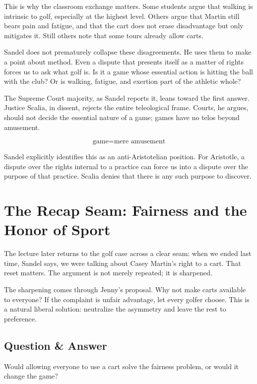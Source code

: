 This is why the classroom exchange matters. Some students argue that walking is intrinsic to golf, especially at the highest level. Others argue that Martin still bears pain and fatigue, and that the cart does not erase disadvantage but only mitigates it. Still others note that some tours already allow carts.

Sandel does not prematurely collapse these disagreements. He uses them to make a point about method. Even a dispute that presents itself as a matter of rights forces us to ask what golf is. Is it a game whose essential action is hitting the ball with the club? Or is walking, fatigue, and exertion part of the athletic whole?

The Supreme Court majority, as Sandel reports it, leans toward the first answer. Justice Scalia, in dissent, rejects the entire teleological frame. Courts, he argues, should not decide the essential nature of a game; games have no telos beyond amusement.

\begin{equation}
\text{game}=\text{mere amusement}
\end{equation}

Sandel explicitly identifies this as an anti-Aristotelian position. For Aristotle, a dispute over the rights internal to a practice can force us into a dispute over the purpose of that practice. Scalia denies that there is any such purpose to discover.

\section{The Recap Seam: Fairness and the Honor of Sport}

The lecture later returns to the golf case across a clear seam: when we ended last time, Sandel says, we were talking about Casey Martin's right to a cart. That reset matters. The argument is not merely repeated; it is sharpened.

The sharpening comes through Jenny's proposal. Why not make carts available to everyone? If the complaint is unfair advantage, let every golfer choose. This is a natural liberal solution: neutralize the asymmetry and leave the rest to preference.

\subsection{Question \& Answer}

Would allowing everyone to use a cart solve the fairness problem, or would it change the game?


